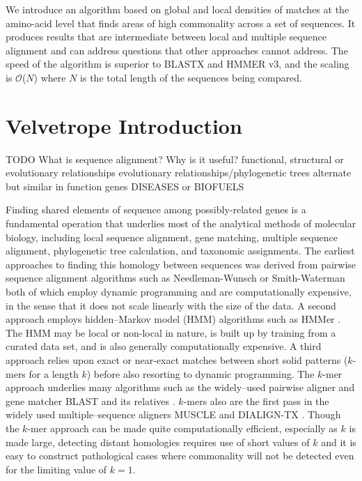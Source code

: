 \documentclass[phd,tocprelim]{cornell}
\begin{document}
We introduce an algorithm based on global and local densities of
matches at the amino-acid level that finds areas of high commonality
across a set of sequences.  It produces results that are intermediate
between local and multiple sequence alignment and can address
questions that other approaches cannot address.  The speed of the
algorithm is superior to BLASTX and HMMER v3, and the scaling is
$\mathcal{O}$($N$) where $N$ is the total length of the sequences
being compared.

\chapter{Velvetrope Introduction} %
\label{cha:Velvetrope Introduction}

TODO
What is sequence alignment? Why is it useful?
functional, structural or evolutionary relationships
evolutionary relationships/phylogenetic trees
alternate but similar in function genes
DISEASES or BIOFUELS

Finding shared elements of sequence among possibly-related genes is a
fundamental operation that underlies most of the analytical methods of
molecular biology, including local sequence alignment, gene matching,
multiple sequence alignment, phylogenetic tree calculation, and
taxonomic assignments. The earliest approaches to finding this homology
between sequences was derived from pairwise sequence alignment algorithms
such as Needleman-Wunsch \cite{Needleman70} or Smith-Waterman
\cite{SmithWaterman} both of which employ dynamic programming and
are computationally expensive, in the sense that it does not scale linearly with the size of the data. A second approach employs
hidden--Markov model (HMM) algorithms such as HMMer
\cite{Eddy98}. The HMM may be local or non-local in nature, is
built up by training from a curated data set, and is also generally
computationally expensive. A third approach relies upon exact or
near-exact matches between short solid patterns ($k$-mers for a length $k$) before also resorting to dynamic programming.  The
$k$-mer approach underlies many algorithms such as the widely--used
pairwise aligner and gene matcher BLAST \cite{BLAST} and its
relatives \cite{BLAT,Megablast,PSIBLAST}. $k$-mers also are the first pass in the widely used multiple--sequence aligners
MUSCLE \cite{MUSCLE} and DIALIGN-TX \cite{DIALIGN-TX}. Though the $k$-mer approach can be made quite computationally
efficient, especially as $k$ is made large, detecting distant
homologies requires use of short values of $k$ and it is easy to
construct pathological cases where commonality will not be detected
even for the limiting value of $k = 1$.
\end{document}

